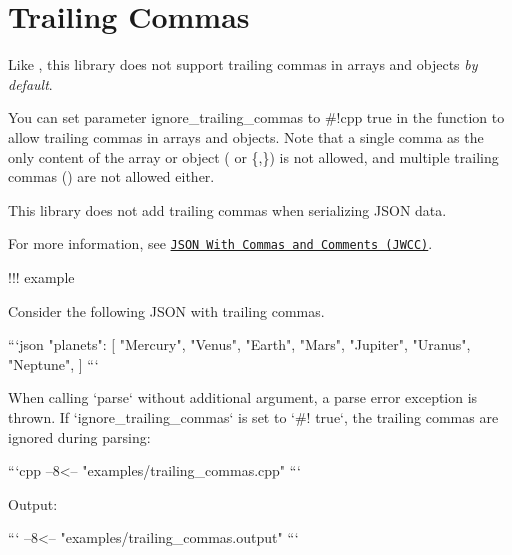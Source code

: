 \chapter{Trailing Commas }
\hypertarget{md_include_2nlohman_2json-develop_2docs_2mkdocs_2docs_2features_2trailing__commas}{}\label{md_include_2nlohman_2json-develop_2docs_2mkdocs_2docs_2features_2trailing__commas}
\label{md_include_2nlohman_2json-develop_2docs_2mkdocs_2docs_2features_2trailing__commas_autotoc_md1511}%
%


Like , this library does not support trailing commas in arrays and objects {\itshape by default}.

You can set parameter {\ttfamily ignore\+\_\+trailing\+\_\+commas} to {\ttfamily \#!cpp true} in the  function to allow trailing commas in arrays and objects. Note that a single comma as the only content of the array or object ({\ttfamily \+[,]\+} or {\ttfamily \{,\}}) is not allowed, and multiple trailing commas ({\ttfamily \+[1,,]\+}) are not allowed either.

This library does not add trailing commas when serializing JSON data.

For more information, see \href{https://nigeltao.github.io/blog/2021/json-with-commas-comments.html}{\texttt{JSON With Commas and Comments (JWCC)}}.

!!! example \begin{DoxyVerb}Consider the following JSON with trailing commas.

```json
{
    "planets": [
        "Mercury",
        "Venus",
        "Earth",
        "Mars",
        "Jupiter",
        "Uranus",
        "Neptune",
    ]
}
```

When calling `parse` without additional argument, a parse error exception is thrown. If `ignore_trailing_commas` is set to `#! true`, the trailing commas are ignored during parsing:

```cpp
--8<-- "examples/trailing_commas.cpp"
```

Output:

```
--8<-- "examples/trailing_commas.output"
```
\end{DoxyVerb}
 
